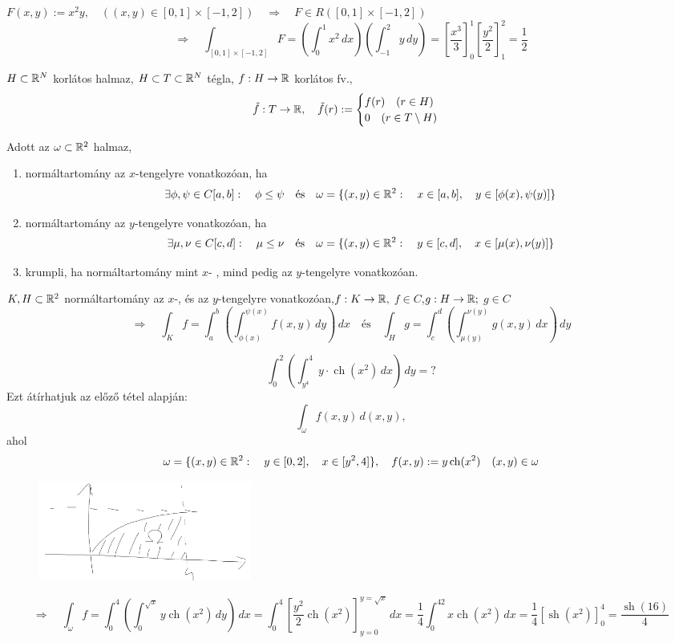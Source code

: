 \documentclass[a4paper,11.5pt]{article}
\DeclareMathOperator{\sh}{sh}
\DeclareMathOperator{\ch}{ch}
\begin{document}
	\begin{example}
		$F(x,y):=x^2y,\quad ((x,y)\in[0,1]\times[-1,2])\quad \Rightarrow\quad F\in R([0,1]\times[-1,2])$
		\[ \Rightarrow\quad \int_{[0,1]\times[-1,2]}F=\left(\int_{0}^{1}x^2\,dx\right)\left(\int_{-1}^{2}y\,dy\right)=\left[\frac{x^3}{3}\right]_0^1 \left[\frac{y^2}{2}\right]_1^2=\frac{1}{2} \]
	\end{example}
	\begin{definition}
		$H\subset\mathbb{R}^N$ korlátos halmaz, $H\subset T\subset\mathbb{R}^N$ tégla, $f:H\to\mathbb{R}$ korlátos fv.,
		\[ \tilde{f}:T\to\mathbb{R},\quad \tilde{f}(r):=\begin{cases}
			f(r)\quad (r\in H)\\
			0\quad (r\in T\setminus H)
		\end{cases} \]
	\end{definition}
	\begin{definition}
		Adott az $\omega\subset \mathbb{R}^2$ halmaz,
		\begin{enumerate}
			\item normáltartomány az $x$-tengelyre vonatkozóan, ha
			\[ \exists\phi,\psi \in C[a,b]:\quad \phi\leq\psi \quad \text{és}\quad \omega=\{(x,y)\in\mathbb{R}^2:\quad x\in[a,b],\quad y\in[\phi(x),\psi (y)] \}\]
			\item normáltartomány az $y$-tengelyre vonatkozóan, ha
			\[ \exists\mu,\nu\in C[c,d]:\quad \mu\leq\nu\quad \text{és}\quad \omega=\{(x,y)\in\mathbb{R}^2:\quad y\in[c,d],\quad x\in[\mu(x),\nu(y)] \}\]
			\item krumpli, ha normáltartomány mint $x$- , mind pedig az $y$-tengelyre vonatkozóan.
		\end{enumerate}
	\end{definition}
	\begin{theorem}
		$K,H\subset\mathbb{R}^2$ normáltartomány az $x$-, és az $y$-tengelyre vonatkozóan,\quad $f:K\to\mathbb{R},$ $f\in C$,\quad $g:H\to \mathbb{R};$ $g\in C$
		\[ \Rightarrow\quad \int_K f=\int_{a}^{b}\left(\int_{\phi(x)}^{\psi (x)}f(x,y)\,dy\right)\,dx\quad \text{és}\quad \int_Hg=\int_{c}^{d}\left(\int_{\mu(y)}^{\nu(y)}g(x,y)\,dx\right)\,dy \]
	\end{theorem}
	\begin{task}
		\[ \int_0^2\left(\int_{y^4}^4y\cdot\ch(x^2)\,dx \right)\,dy=? \]
		Ezt átírhatjuk az előző tétel alapján:
		\[ \int_{\omega}^{}f(x,y)\,d(x,y), \]
		ahol 
		\[ \omega=\{(x,y)\in\R^2:\quad y\in[0,2], \quad x\in[y^2,4]\},\quad f(x,y):=y\ch(x^2)\quad (x,y)\in\omega  \]
		\begin{figure}[h]
			\centering
			\includegraphics[width=7cm]{kepek/01.png}
			\caption{}
		\end{figure}
		\[ \Rightarrow \quad \int_{\omega}^{}f=\int_0^4\left(\int_{0}^{\sqrt{x}}y\ch(x^2)\,dy\right)\,dx=\int_{0}^{4}\left[\frac{y^2}{2}\ch(x^2)\right]_{y=0}^{y=\sqrt{x}}\,dx=\frac{1}{4}\int_0^42x\ch(x^2)\,dx=\frac{1}{4}\left[\sh(x^2)\right]_0^4=\frac{\sh(16)}{4} \]
	\end{task}
\end{document}
